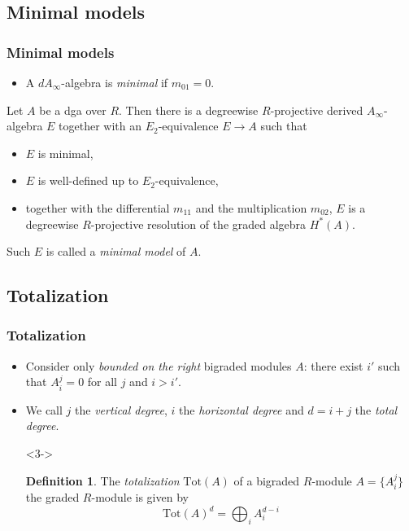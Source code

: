 \documentclass{beamer}
\theoremstyle{definition}
\newtheorem{defi}{Definition}
\newcommand{\Tot}{\mathrm{Tot}}
\begin{document}
\subsection{Minimal models}
\begin{frame}
\frametitle{Minimal models}
\begin{itemize}
\item A $dA_\infty$-algebra is \emph{minimal} if $m_{01} = 0$. 
\end{itemize}\pause
\begin{theorem}[Sagave]
Let $A$ be a dga over $R$. Then there is a degreewise
$R$-projective derived $A_\infty$-algebra $E$ together with an $E_2$-equivalence $E \to A$ such that
\begin{itemize}
\item $E$ is minimal,
\item $E$ is well-defined up to $E_2$-equivalence,
\item together with the differential $m_{11}$ and the multiplication $m_{02}$, $E$ is a degreewise $R$-projective
resolution of the graded algebra $H^*(A)$. 
\end{itemize}
\end{theorem}\pause
Such $E$ is called a \emph{minimal model} of $A$.
\end{frame}

\subsection{Totalization}
\begin{frame}
\frametitle{Totalization}
\begin{itemize}
\item<1-> Consider only \emph{bounded on the right} bigraded modules $A$: there exist $i'$ such that $A_i^j=0$ for all $j$ and $i>i'$. %
\item<2-> We call $j$ the \emph{vertical degree}, $i$ the \emph{horizontal degree} and $d=i+j$ the \emph{total degree}.
\item[]<3->
\begin{defi}
The \emph{totalization} $\Tot(A)$ of a bigraded $R$-module $A = \{A^j_i \}$ the graded $R$-module is given by
\[\Tot(A)^d =
\bigoplus_{i}A^{d-i}_i \]%
\end{defi}
\end{itemize}
\end{frame}
\end{document}
